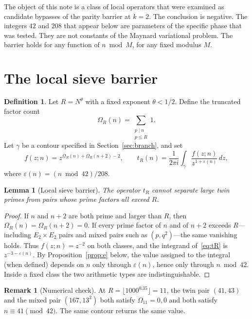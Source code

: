 \documentclass[11pt,a4paper]{article}
\theoremstyle{plain}
\newtheorem{lemma}{Lemma}
\theoremstyle{definition}
\newtheorem{remark}{Remark}
\newtheorem{definition}{Definition}
\theoremstyle{plain}
\numberwithin{equation}{section}
\begin{document}
The object of this note is a class of local operators that were examined as candidate bypasses of the parity barrier at \(k=2\). The conclusion is negative. The integers \(42\) and \(208\) that appear below are parameters of the specific phase that was tested. They are not constants of the Maynard variational problem. The barrier holds for any function of \(n\bmod M\), for any fixed modulus \(M\).

\section{The local sieve barrier}

\begin{definition}
Let \(R=N^{\theta}\) with a fixed exponent \(\theta<1/2\). Define the truncated factor count
\[
\Omega_R(n)=\sum_{\substack{p\mid n\\ p\le R}}1.
\]
Let \(\gamma\) be a contour specified in Section~\ref{sec:branch}, and set
\begin{equation}
\label{eq:tR}
f(z;n)=z^{\Omega_R(n)+\Omega_R(n+2)-2},\qquad
t_R(n)=\frac{1}{2\pi i}\int_{\gamma}\frac{f(z;n)}{z^{1+\varepsilon(n)}}\,dz,
\end{equation}
where \(\varepsilon(n)=(n\bmod 42)/208\).
\end{definition}

\begin{lemma}[Local sieve barrier]
\label{lem:local}
The operator \(t_R\) cannot separate large twin primes from pairs whose prime factors all exceed \(R\).
\end{lemma}

\begin{proof}
If \(n\) and \(n+2\) are both prime and larger than \(R\), then \(\Omega_R(n)=\Omega_R(n+2)=0\). If every prime factor of \(n\) and of \(n+2\) exceeds \(R\)---including \(E_2\times E_2\) pairs and mixed pairs such as \((p,q^2)\)---the same vanishing holds. Thus \(f(z;n)=z^{-2}\) on both classes, and the integrand of~\eqref{eq:tR} is \(z^{-3-\varepsilon(n)}\). By Proposition~\ref{prop:e} below, the value assigned to the integral (when defined) depends on \(n\) only through \(\varepsilon(n)\), hence only through \(n\bmod 42\). Inside a fixed class the two arithmetic types are indistinguishable.
\end{proof}

\begin{remark}[Numerical check]
At \(R=\lfloor 1000^{0.35}\rfloor=11\), the twin pair \((41,43)\) and the mixed pair \((167,13^2)\) both satisfy \(\Omega_{11}=0,0\) and both satisfy \(n\equiv 41\pmod{42}\). The same contour returns the same value.
\end{remark}
\end{document}
